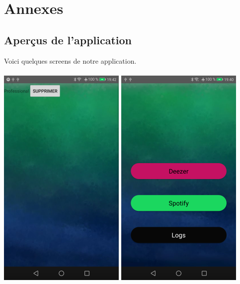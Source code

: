 \documentclass[12pt, openany]{report}
\begin{document}
\newpage
\section{Annexes}
\subsection{Aperçus de l'application}
Voici quelques screens de notre application.
\\
\\
\includegraphics[scale=0.7]{images/list-users-page.png}
\includegraphics[scale=0.7]{images/login-page.png}
\end{document}
